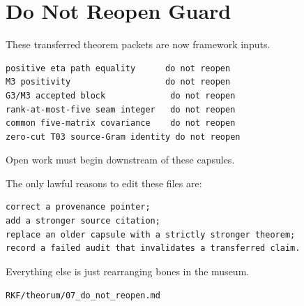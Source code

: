 \hypertarget{do-not-reopen-guard}{%
\chapter{Do Not Reopen Guard}\label{do-not-reopen-guard}}

These transferred theorem packets are now framework inputs.

\begin{verbatim}
positive eta path equality      do not reopen
M3 positivity                   do not reopen
G3/M3 accepted block             do not reopen
rank-at-most-five seam integer   do not reopen
common five-matrix covariance    do not reopen
zero-cut T03 source-Gram identity do not reopen
\end{verbatim}

Open work must begin downstream of these capsules.

The only lawful reasons to edit these files are:

\begin{verbatim}
correct a provenance pointer;
add a stronger source citation;
replace an older capsule with a strictly stronger theorem;
record a failed audit that invalidates a transferred claim.
\end{verbatim}

Everything else is just rearranging bones in the museum.

\begin{flushright}\small\texttt{RKF/theorum/07\_do\_not\_reopen.md}\end{flushright}
